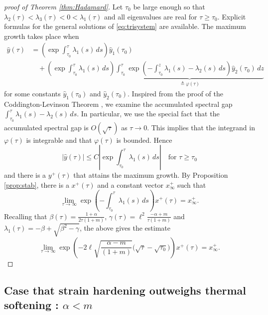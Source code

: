 \documentclass[a4paper,11pt]{article}
\def\l{{\ell}}
\theoremstyle{remark}
\begin{document}
\begin{proof}[proof of Theorem \ref{thm:Hadamard}]
Let $\tau_0$ be large enough so that $\lambda_2(\tau) < \lambda_3(\tau) < 0 < \lambda_1(\tau)$ and all eigenvalues are real for $\tau\ge \tau_0$. Explicit formulas for the general solutions of \eqref{eq:trisystem} are available. The maximum growth  takes place when
$$
\begin{aligned}
 \hat{y}(\tau) &=\left(\exp{\int_{\tau_0}^\tau \lambda_1(s)\, ds} \right)\hat y_1(\tau_0) 
 \\
 &\quad +  \left(\exp{\int_{\tau_0}^\tau \lambda_1(s)\, ds}\right) \underbrace{\int_{\tau_0}^\tau \exp{\left(-\int_{\tau_0}^z \lambda_1(s)-\lambda_2(s)\,ds\right)}\hat y_2(\tau_0) \, dz}_{\triangleq \varphi(\tau)}
\end{aligned}
$$
for some constants $\hat{y}_1(\tau_0)$ and $\hat{y}_2(\tau_0)$. Inspired from the proof of the Coddington-Levinson Theorem \cite{CL55}, we examine the accumulated spectral gap $\int_{\tau_0}^\tau \lambda_1(s)-\lambda_2(s)\,ds$. In particular, we use the special fact that the accumulated spectral gap is ${O}(\sqrt{\tau})$ as $\tau \rightarrow 0$. This implies that the integrand in $\varphi(\tau)$ is integrable and that $\varphi(\tau)$ is bounded. Hence
$$|\hat{y}(\tau)|\le C \left| \exp{\int_{\tau_0}^\tau \lambda_1(s)\, ds}\right| \quad \text{for }\tau\ge\tau_0$$
and there is a $y^+(\tau)$ that attains the maximum growth. By Proposition \ref{prop:stab}, there is a $x^+(\tau)$ and a constant vector $x^+_\infty$ such that
\begin{equation*}
  \lim_{\tau \rightarrow \infty}\exp{\left(-\int_{\tau_0}^\tau \lambda_1(s)\, ds\right)} x^+(\tau) = x^+_\infty.
\end{equation*}
Recalling that $\beta(\tau) = \frac{1+\alpha}{2\tau(1+m)}$, $\gamma(\tau)= \l^2\frac{-\alpha+m}{\tau(1+m)}$ and $\lambda_1(\tau) = -\beta + \sqrt{\beta^2-\gamma}$, the above gives the estimate
\begin{equation}
  \lim_{\tau \rightarrow \infty}\exp{\left(-2\l\sqrt{\frac{\alpha-m}{(1+m)}}\big(\sqrt{\tau}-\sqrt{\tau_0}\big)\right)} x^+(\tau) = x^+_\infty.
\end{equation}
\end{proof}

\subsection{Case that  strain hardening outweighs   thermal softening : $\alpha < m$}
\end{document}
